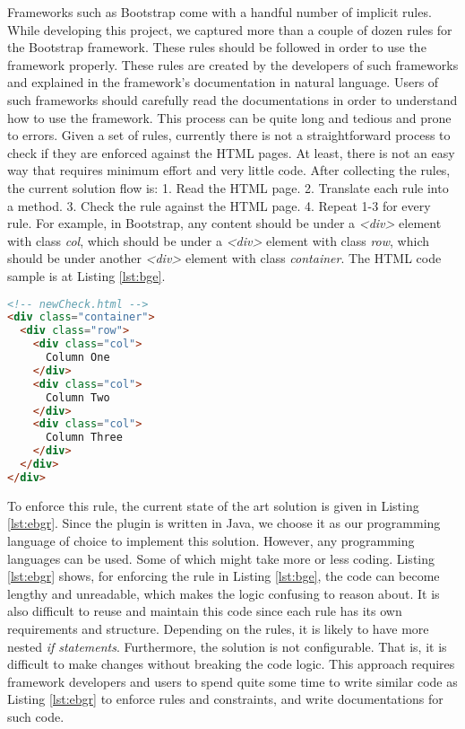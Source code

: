 \documentclass[conference]{IEEETran}
\begin{document}
Frameworks such as Bootstrap come with a handful number of implicit rules. While developing this project, we captured more than a couple of dozen rules for the Bootstrap framework. These rules should be followed in order to use the framework properly. These rules are created by the developers of such frameworks and explained in the framework’s documentation in natural language. Users of such frameworks should carefully read the documentations in order to understand how to use the framework. This process can be quite long and tedious and prone to errors. Given a set of rules, currently there is not a straightforward process to check if they are enforced against the HTML pages. At least, there is not an easy way that requires minimum effort and very little code. After collecting the rules, the current solution flow is:
1. Read the HTML page. 
2. Translate each rule into a method. 
3. Check the rule against the HTML page.
4. Repeat 1-3 for every rule.
For example, in Bootstrap, any content should be under a \textit{<div>} element with class \textit{col}, which should be under a \textit{<div>} element with class \textit{row}, which should be under another \textit{<div>} element with class \textit{container}. The HTML code sample is at Listing \ref{lst:bge}.  

\begin{lstlisting}[language=HTML, caption=Bootstrap Grid Example, label={lst:bge}]
<!-- newCheck.html -->
<div class="container">
  <div class="row">
    <div class="col">
      Column One
    </div>
    <div class="col">
      Column Two
    </div>
    <div class="col">
      Column Three
    </div>
  </div>
</div>
\end{lstlisting}

To enforce this rule, the current state of the art solution is given in Listing \ref{lst:ebgr}. Since the plugin is written in Java, we choose it as our programming language of choice to implement this solution. However, any programming languages can be used. Some of which might take more or less coding. Listing \ref{lst:ebgr} shows, for enforcing the rule in Listing \ref{lst:bge}, the code can become lengthy and unreadable, which makes the logic confusing to reason about. It is also difficult to reuse and maintain this code since each rule has its own requirements and structure. Depending on the rules, it is likely to have more nested \textit{if statements}. Furthermore, the solution is not configurable. That is, it is difficult to make changes without breaking the code logic. This approach requires framework developers and users to spend quite some time to write similar code as Listing \ref{lst:ebgr} to enforce rules and constraints, and write documentations for such code.   
\end{document}
